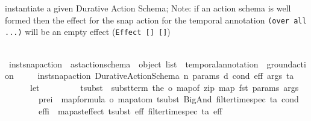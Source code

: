\begin{isabellebody}
\begin{isamarkuptext}%
instantiate a given Durative Action Schema; 
  Note: if an action schema is well formed then the effect for the snap action for the 
  temporal annotation \texttt{(over all ...)} will be an empty effect (\texttt{Effect [] []})%
\end{isamarkuptext}\isamarkuptrue%
\ \ \isamarkupfalse%
\ inst{\isacharunderscore}{\kern0pt}snap{\isacharunderscore}{\kern0pt}action\ {\isacharcolon}{\kern0pt}{\isacharcolon}{\kern0pt}\ {\isachardoublequoteopen}ast{\isacharunderscore}{\kern0pt}action{\isacharunderscore}{\kern0pt}schema\ {\isasymRightarrow}\ object\ list\ {\isasymRightarrow}\ temporal{\isacharunderscore}{\kern0pt}annotation\ {\isasymRightarrow}\ ground{\isacharunderscore}{\kern0pt}action{\isachardoublequoteclose}\ \isanewline
\ \ \ \ {\isachardoublequoteopen}inst{\isacharunderscore}{\kern0pt}snap{\isacharunderscore}{\kern0pt}action\ {\isacharparenleft}{\kern0pt}Durative{\isacharunderscore}{\kern0pt}Action{\isacharunderscore}{\kern0pt}Schema\ n\ params\ d\ cond\ eff{\isacharparenright}{\kern0pt}\ args\ ta\ {\isacharequal}{\kern0pt}\ \isanewline
\ \ \ \ \ \ {\isacharparenleft}{\kern0pt}let\ \isanewline
\ \ \ \ \ \ \ \ tsubst\ {\isacharequal}{\kern0pt}\ subst{\isacharunderscore}{\kern0pt}term\ {\isacharparenleft}{\kern0pt}the\ o\ {\isacharparenleft}{\kern0pt}map{\isacharunderscore}{\kern0pt}of\ {\isacharparenleft}{\kern0pt}zip\ {\isacharparenleft}{\kern0pt}map\ fst\ params{\isacharparenright}{\kern0pt}\ args{\isacharparenright}{\kern0pt}{\isacharparenright}{\kern0pt}{\isacharparenright}{\kern0pt}{\isacharsemicolon}{\kern0pt}\isanewline
\ \ \ \ \ \ \ \ pre\isactrlsub i\ {\isacharequal}{\kern0pt}\ {\isacharparenleft}{\kern0pt}map{\isacharunderscore}{\kern0pt}formula\ o\ map{\isacharunderscore}{\kern0pt}atom{\isacharparenright}{\kern0pt}\ tsubst\ {\isacharparenleft}{\kern0pt}BigAnd\ {\isacharparenleft}{\kern0pt}filter{\isacharunderscore}{\kern0pt}time{\isacharunderscore}{\kern0pt}spec\ ta\ cond{\isacharparenright}{\kern0pt}{\isacharparenright}{\kern0pt}{\isacharsemicolon}{\kern0pt}\isanewline
\ \ \ \ \ \ \ \ eff\isactrlsub i\ {\isacharequal}{\kern0pt}\ {\isacharparenleft}{\kern0pt}map{\isacharunderscore}{\kern0pt}ast{\isacharunderscore}{\kern0pt}effect{\isacharparenright}{\kern0pt}\ tsubst\ {\isacharparenleft}{\kern0pt}{\isasymAnd}\isactrlsub e\isactrlsub f\isactrlsub f\ {\isacharparenleft}{\kern0pt}filter{\isacharunderscore}{\kern0pt}time{\isacharunderscore}{\kern0pt}spec\ ta\ eff{\isacharparenright}{\kern0pt}{\isacharparenright}{\kern0pt}\ \isanewline

\end{isabellebody}
